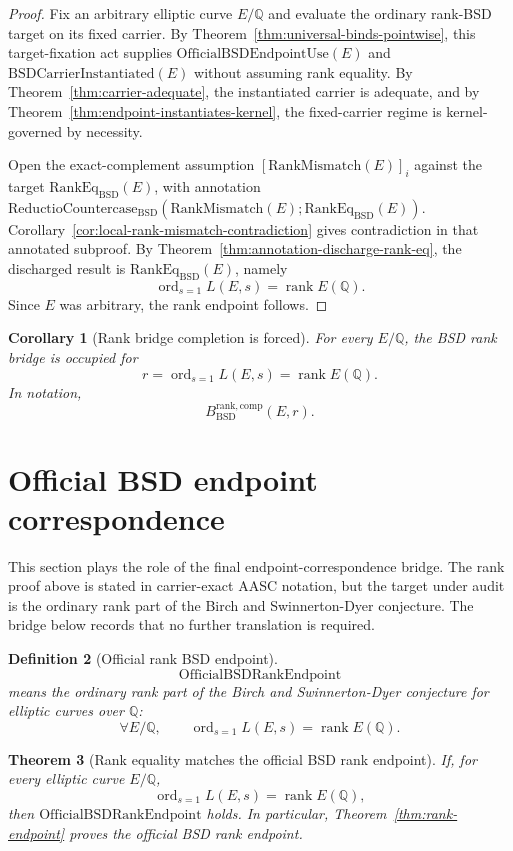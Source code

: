 \documentclass[11pt]{article}
\newtheorem{theorem}{Theorem}[section]
\newtheorem{corollary}[theorem]{Corollary}
\newtheorem{definition}[theorem]{Definition}
\newcommand{\Q}{\mathbb{Q}}
\newcommand{\rank}{\operatorname{rank}}
\newcommand{\ord}{\operatorname{ord}}
\newcommand{\BSD}{\mathrm{BSD}}
\newcommand{\RankMismatch}{\mathrm{RankMismatch}}
\newcommand{\RankEq}{\mathrm{RankEq}_{\BSD}}
\newcommand{\ReductioBSD}{\mathrm{ReductioCountercase}_{\BSD}}
\newcommand{\BsdRankBridgeComp}{B^{\mathrm{rank,comp}}_{\BSD}}
\newcommand{\OfficialRankEndpoint}{\mathrm{OfficialBSDRankEndpoint}}
\begin{document}
\begin{proof}
Fix an arbitrary elliptic curve $E/\Q$ and evaluate the ordinary rank-BSD target on its fixed carrier. By Theorem~\ref{thm:universal-binds-pointwise}, this target-fixation act supplies $\mathrm{OfficialBSDEndpointUse}(E)$ and $\mathrm{BSDCarrierInstantiated}(E)$ without assuming rank equality. By Theorem~\ref{thm:carrier-adequate}, the instantiated carrier is adequate, and by Theorem~\ref{thm:endpoint-instantiates-kernel}, the fixed-carrier regime is kernel-governed by necessity.

Open the exact-complement assumption $[\RankMismatch(E)]_i$ against the target $\RankEq(E)$, with annotation $\ReductioBSD(\RankMismatch(E);\RankEq(E))$. Corollary~\ref{cor:local-rank-mismatch-contradiction} gives contradiction in that annotated subproof. By Theorem~\ref{thm:annotation-discharge-rank-eq}, the discharged result is $\RankEq(E)$, namely
\[
\ord_{s=1}L(E,s)=\rank E(\Q).
\]
Since $E$ was arbitrary, the rank endpoint follows.
\end{proof}

\begin{corollary}[Rank bridge completion is forced]
For every $E/\Q$, the BSD rank bridge is occupied for
\[
r=\ord_{s=1}L(E,s)=\rank E(\Q).
\]
In notation,
\[
\BsdRankBridgeComp(E,r).
\]
\end{corollary}


\section{Official BSD endpoint correspondence}

This section plays the role of the final endpoint-correspondence bridge. The rank proof above is stated in carrier-exact AASC notation, but the target under audit is the ordinary rank part of the Birch and Swinnerton-Dyer conjecture. The bridge below records that no further translation is required.

\begin{definition}[Official rank BSD endpoint]
\[
\OfficialRankEndpoint
\]
means the ordinary rank part of the Birch and Swinnerton-Dyer conjecture for elliptic curves over $\Q$:
\[
\forall E/\Q,\qquad \ord_{s=1}L(E,s)=\rank E(\Q).
\]
\end{definition}

\begin{theorem}[Rank equality matches the official BSD rank endpoint]\label{thm:official-rank-correspondence}
If, for every elliptic curve $E/\Q$,
\[
\ord_{s=1}L(E,s)=\rank E(\Q),
\]
then $\OfficialRankEndpoint$ holds. In particular, Theorem~\ref{thm:rank-endpoint} proves the official BSD rank endpoint.
\end{theorem}
\end{document}

